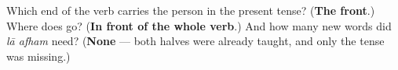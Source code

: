 \begin{tcolorbox}[breakable,colback=teal!4,colframe=teal!35!black,title={Before you move on}]
Which end of the verb carries the person in the present tense? (\textbf{The front}.) Where does \textbf{} go? (\textbf{In front of the whole verb}.) And how many new words did \emph{lā afham} need? (\textbf{None} — both halves were already taught, and only the tense was missing.)
\end{tcolorbox}

